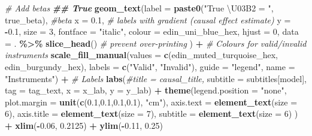 \documentclass[
]{article}
\newenvironment{Shaded}{\begin{snugshade}}{\end{snugshade}}
\newcommand{\AttributeTok}[1]{\textcolor[rgb]{0.13,0.29,0.53}{#1}}
\newcommand{\CommentTok}[1]{\textcolor[rgb]{0.56,0.35,0.01}{\textit{#1}}}
\newcommand{\DecValTok}[1]{\textcolor[rgb]{0.00,0.00,0.81}{#1}}
\newcommand{\DocumentationTok}[1]{\textcolor[rgb]{0.56,0.35,0.01}{\textbf{\textit{#1}}}}
\newcommand{\FloatTok}[1]{\textcolor[rgb]{0.00,0.00,0.81}{#1}}
\newcommand{\FunctionTok}[1]{\textcolor[rgb]{0.13,0.29,0.53}{\textbf{#1}}}
\newcommand{\NormalTok}[1]{#1}
\newcommand{\SpecialCharTok}[1]{\textcolor[rgb]{0.81,0.36,0.00}{\textbf{#1}}}
\newcommand{\StringTok}[1]{\textcolor[rgb]{0.31,0.60,0.02}{#1}}
\begin{document}
\begin{Shaded}
\begin{Highlighting}[]
    \CommentTok{\# Add betas}
    \DocumentationTok{\#\# True}
    \FunctionTok{geom\_text}\NormalTok{(}\AttributeTok{label =} \FunctionTok{paste0}\NormalTok{(}\StringTok{"True \textbackslash{}U03B2 = "}\NormalTok{, true\_beta), }\CommentTok{\#beta}
              \AttributeTok{x =} \FloatTok{0.1}\NormalTok{, }\CommentTok{\# labels with gradient (causal effect estimate)}
              \AttributeTok{y =} \SpecialCharTok{{-}}\FloatTok{0.1}\NormalTok{,}
              \AttributeTok{size =} \DecValTok{3}\NormalTok{,}
              \AttributeTok{fontface =} \StringTok{"italic"}\NormalTok{,}
              \AttributeTok{colour =}\NormalTok{ edin\_uni\_blue\_hex,}
              \AttributeTok{hjust =} \DecValTok{0}\NormalTok{,}
              \AttributeTok{data =}\NormalTok{ . }\SpecialCharTok{\%\textgreater{}\%} \FunctionTok{slice\_head}\NormalTok{() }\CommentTok{\# prevent over{-}printing}
\NormalTok{    ) }\SpecialCharTok{+}
    \CommentTok{\# Colours for valid/invalid instruments}
    \FunctionTok{scale\_fill\_manual}\NormalTok{(}\AttributeTok{values =} \FunctionTok{c}\NormalTok{(edin\_muted\_turquoise\_hex, edin\_burgundy\_hex),}
                      \AttributeTok{labels =} \FunctionTok{c}\NormalTok{(}\StringTok{"Valid"}\NormalTok{, }\StringTok{"Invalid"}\NormalTok{),}
                      \AttributeTok{guide =} \StringTok{"legend"}\NormalTok{,}
                      \AttributeTok{name =} \StringTok{"Instruments"}\NormalTok{) }\SpecialCharTok{+}
    \CommentTok{\# Labels}
    \FunctionTok{labs}\NormalTok{(}\CommentTok{\#title = causal\_title,}
         \AttributeTok{subtitle =}\NormalTok{ subtitles[model],}
         \AttributeTok{tag =}\NormalTok{ tag\_text,}
         \AttributeTok{x =}\NormalTok{ x\_lab,}
         \AttributeTok{y =}\NormalTok{ y\_lab) }\SpecialCharTok{+}
    \FunctionTok{theme}\NormalTok{(}\AttributeTok{legend.position =} \StringTok{"none"}\NormalTok{,}
          \AttributeTok{plot.margin =} \FunctionTok{unit}\NormalTok{(}\FunctionTok{c}\NormalTok{(}\FloatTok{0.1}\NormalTok{,}\FloatTok{0.1}\NormalTok{,}\FloatTok{0.1}\NormalTok{,}\FloatTok{0.1}\NormalTok{), }\StringTok{"cm"}\NormalTok{),}
          \AttributeTok{axis.text =} \FunctionTok{element\_text}\NormalTok{(}\AttributeTok{size =} \DecValTok{6}\NormalTok{), }
          \AttributeTok{axis.title =} \FunctionTok{element\_text}\NormalTok{(}\AttributeTok{size =} \DecValTok{7}\NormalTok{), }
          \AttributeTok{subtitle =} \FunctionTok{element\_text}\NormalTok{(}\AttributeTok{size =} \DecValTok{6}\NormalTok{)}
\NormalTok{          ) }\SpecialCharTok{+}
    \FunctionTok{xlim}\NormalTok{(}\SpecialCharTok{{-}}\FloatTok{0.06}\NormalTok{, }\FloatTok{0.2125}\NormalTok{) }\SpecialCharTok{+}
    \FunctionTok{ylim}\NormalTok{(}\SpecialCharTok{{-}}\FloatTok{0.11}\NormalTok{, }\FloatTok{0.25}\NormalTok{) }
  

\end{Highlighting}
\end{Shaded}
\end{document}
